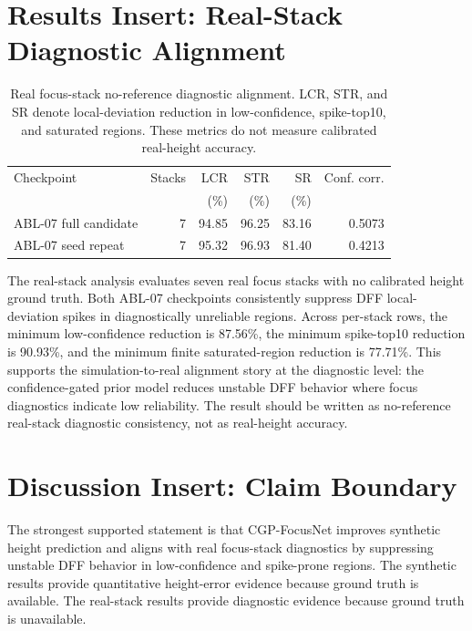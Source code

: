 \documentclass[11pt,a4paper]{article}
\newcommand{\method}{CGP-FocusNet}
\begin{document}
\section*{Results Insert: Real-Stack Diagnostic Alignment}

\begin{table}[h]
  \centering
  \caption{Real focus-stack no-reference diagnostic alignment. LCR, STR, and SR denote local-deviation reduction in low-confidence, spike-top10, and saturated regions. These metrics do not measure calibrated real-height accuracy.}
  \label{tab:cgp_real_alignment}
  \footnotesize
  \setlength{\tabcolsep}{3.2pt}
  \begin{tabular}{lrrrrr}
    \toprule
    Checkpoint & Stacks & LCR & STR & SR & Conf. corr. \\
    & & (\%) & (\%) & (\%) & \\
    \midrule
    ABL-07 full candidate & 7 & 94.85 & 96.25 & 83.16 & 0.5073 \\
    ABL-07 seed repeat & 7 & 95.32 & 96.93 & 81.40 & 0.4213 \\
    \bottomrule
  \end{tabular}
\end{table}

The real-stack analysis evaluates seven real focus stacks with no calibrated height ground truth. Both ABL-07 checkpoints consistently suppress DFF local-deviation spikes in diagnostically unreliable regions. Across per-stack rows, the minimum low-confidence reduction is 87.56\%, the minimum spike-top10 reduction is 90.93\%, and the minimum finite saturated-region reduction is 77.71\%. This supports the simulation-to-real alignment story at the diagnostic level: the confidence-gated prior model reduces unstable DFF behavior where focus diagnostics indicate low reliability. The result should be written as no-reference real-stack diagnostic consistency, not as real-height accuracy.

\section*{Discussion Insert: Claim Boundary}

The strongest supported statement is that \method{} improves synthetic height prediction and aligns with real focus-stack diagnostics by suppressing unstable DFF behavior in low-confidence and spike-prone regions. The synthetic results provide quantitative height-error evidence because ground truth is available. The real-stack results provide diagnostic evidence because ground truth is unavailable.
\end{document}

